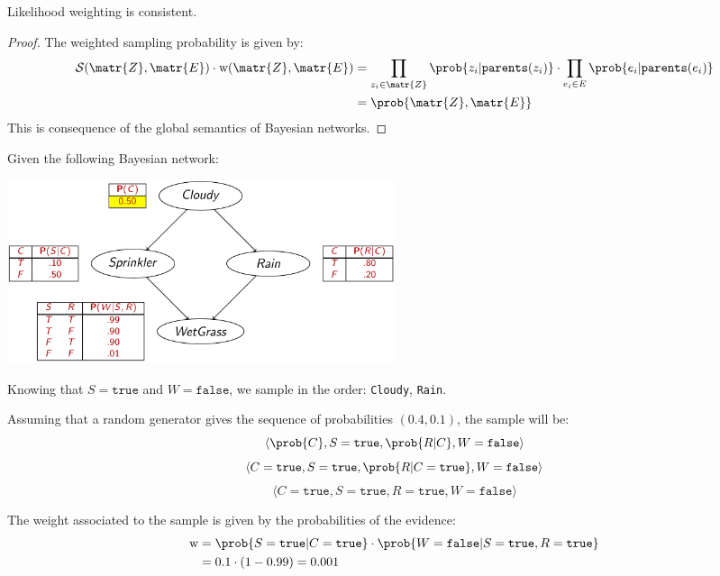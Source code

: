 \begin{theorem}
    Likelihood weighting is consistent.

    \begin{proof}
        The weighted sampling probability is given by:
        \[ 
            \begin{split}
                \mathcal{S}(\matr{Z}, \matr{E}) \cdot \text{w}(\matr{Z}, \matr{E})
                &= \prod_{z_i \in \matr{Z}} \prob{z_i | \texttt{parents}(z_i)} \cdot \prod_{e_i \in E} \prob{e_i | \texttt{parents}(e_i)} \\
                &= \prob{\matr{Z}, \matr{E}}
            \end{split}
        \]
        This is consequence of the global semantics of Bayesian networks.
    \end{proof}
\end{theorem}

\begin{example}
    Given the following Bayesian network:
    \begin{center}
        \includegraphics[width=0.5\textwidth]{img/_approx_infer_example.pdf}
    \end{center}

    Knowing that $S=\texttt{true}$ and $W=\texttt{false}$,
    we sample in the order: \texttt{Cloudy}, \texttt{Rain}.
    
    Assuming that a random generator gives the sequence of probabilities $(0.4, 0.1)$,
    the sample will be:
    \[ \langle \prob{C}, S=\texttt{true}, \prob{R | C}, W=\texttt{false} \rangle \]
    \[ \langle C=\texttt{true}, S=\texttt{true}, \prob{R | C=\texttt{true}}, W=\texttt{false} \rangle \]
    \[ \langle C=\texttt{true}, S=\texttt{true}, R=\texttt{true}, W=\texttt{false} \rangle \]

    The weight associated to the sample is given by the probabilities of the evidence:
    \[ 
        \begin{split}
            \text{w} &= \prob{S=\texttt{true} | C=\texttt{true}} \cdot \prob{W=\texttt{false} | S=\texttt{true}, R=\texttt{true}} \\
            &= 0.1 \cdot (1 - 0.99) = 0.001
        \end{split}
    \]
\end{example}



